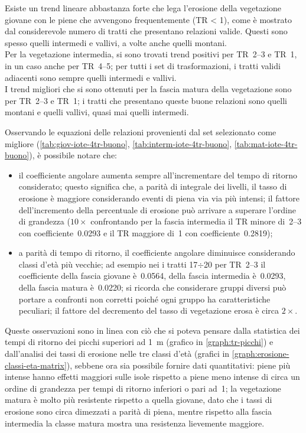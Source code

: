 Esiste un trend lineare abbastanza forte che lega l'erosione della vegetazione giovane con le piene che avvengono frequentemente (TR \SI{< 1}{\anno}), come è mostrato dal considerevole numero di tratti che presentano relazioni valide.
Questi sono spesso quelli intermedi e vallivi, a volte anche quelli montani.
\\
Per la vegetazione intermedia, si sono trovati trend positivi per TR~\SIrange[range-phrase = {-}, range-units = single]{2}{3}{\mesi} e TR~\SI{1}{\anno}, in un caso anche per TR~\SIrange[range-phrase = {-}, range-units = single]{4}{5}{\mesi}; per tutti i set di trasformazioni, i tratti validi adiacenti sono sempre quelli intermedi e vallivi.
\\
I trend migliori che si sono ottenuti per la fascia matura della vegetazione sono per TR~\SIrange[range-phrase = {-}, range-units = single]{2}{3}{\mesi} e TR~\SI{1}{\anno}; i tratti che presentano queste buone relazioni sono quelli montani e quelli vallivi, quasi mai quelli intermedi.

Osservando le equazioni delle relazioni provenienti dal set selezionato come migliore (\cref{tab:giov-iote-4tr-buono}, \cref{tab:interm-iote-4tr-buono}, \cref{tab:mat-iote-4tr-buono}), è possibile notare che:
%
\begin{itemize}
	\item il coefficiente angolare aumenta sempre all'incrementare del tempo di ritorno considerato;
	questo significa che, a parità di integrale dei livelli, il tasso di erosione è maggiore considerando eventi di piena via via più intensi;
	il fattore dell'incremento della percentuale di erosione può arrivare a superare l'ordine di grandezza ($10\times$ confrontando per la fascia intermedia il TR minore di~\SIrange[range-phrase = {-}, range-units = single]{2}{3}{\mesi} con coefficiente~\num{0.0293} e il TR maggiore di~\SI{1}{\anno} con coefficiente~\num{0.2819});
	\item a parità di tempo di ritorno, il coefficiente angolare diminuisce considerando classi d'età più vecchie; ad esempio nei i tratti 17$\div$20 per TR~\SIrange[range-phrase = {-}, range-units = single]{2}{3}{\mesi} il coefficiente della fascia giovane è~\num{0.0564}, della fascia intermedia è~\num{0.0293}, della fascia matura è~\num{0.0220};
	si ricorda che considerare gruppi diversi può portare a confronti non corretti poiché ogni gruppo ha caratteristiche peculiari;
	il fattore del decremento del tasso di vegetazione erosa è circa $2 \times$.
\end{itemize}
%
Queste osservazioni sono in linea con ciò che si poteva pensare dalla statistica dei tempi di ritorno dei picchi superiori ad \SI{1}{\m} (grafico in \cref{graph:tr-picchi}) e dall'analisi dei tassi di erosione nelle tre classi d'età (grafici in \cref{graph:erosione-classi-eta-matrix}), sebbene ora sia possibile fornire dati quantitativi:
piene più intense hanno effetti maggiori sulle isole rispetto a piene meno intense di circa un ordine di grandezza per tempi di ritorno inferiori o pari ad~\SI{1}{\anno};
la vegetazione matura è molto più resistente rispetto a quella giovane, dato che i tassi di erosione sono circa dimezzati a parità di piena, mentre rispetto alla fascia intermedia la classe matura mostra una resistenza lievemente maggiore.

